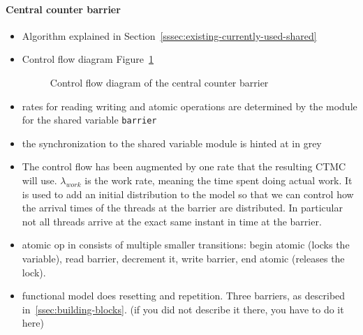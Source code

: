 \documentclass[a4paper, 10pt]{article}
\begin{document}
\begin{enumerate}
\paragraph{Central counter barrier}
\label{sssec:analysis-modelchecking-modelling-central-counter}
\begin{itemize}
	\item Algorithm explained in Section~\ref{sssec:existing-currently-used-shared}
	\item Control flow diagram Figure~\ref{fig:central-counter-control-flow}
		\begin{figure}[htbp]
			\centering
			
			\caption{Control flow diagram of the central counter barrier}
			\label{fig:central-counter-control-flow}
		\end{figure}
	\item rates for reading writing and atomic operations are determined by the module for the shared variable \texttt{barrier}
	\item the synchronization to the shared variable module is hinted at in grey
	\item The control flow has been augmented by one rate that the resulting CTMC will use. $\lambda_{work}$ is the work rate, meaning the time spent doing actual work. It is used to add an initial distribution to the model so that we can control how the arrival times of the threads at the barrier are distributed. In particular not all threads arrive at the exact same instant in time at the barrier.
	\item atomic op in consists of multiple smaller transitions: begin atomic (locks the variable), read barrier, decrement it, write barrier, end atomic (releases the lock).
	\item functional model does resetting and repetition. Three barriers, as described in~\ref{ssec:building-blocks}. (if you did not describe it there, you have to do it here)
\end{itemize}


\end{enumerate}
\end{document}
